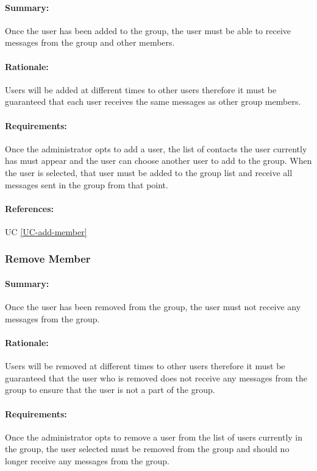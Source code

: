 \documentclass[11pt]{article}
\begin{document}
\paragraph{Summary:}
Once the user has been added to the group, the user must be able to receive messages from the group and other members.
\paragraph{Rationale:}
Users will be added at different times to other users therefore it must be guaranteed that each user receives the same messages as other group members.
\paragraph{Requirements:}
Once the administrator opts to add a user, the list of contacts the user currently has must appear and the user can choose another user to add to the group. When the user is selected, that user must be added to the group list and receive all messages sent in the group from that point.
\paragraph{References:} UC \ref{UC-add-member}

\subsubsection{Remove Member} \label{FR-remove-member}
\paragraph{Summary:}
Once the user has been removed from the group, the user must not receive any messages from the group.
\paragraph{Rationale:}
Users will be removed at different times to other users therefore it must be guaranteed that the user who is removed does not receive any messages from the group to ensure that the user is not a part of the group.
\paragraph{Requirements:}
Once the administrator opts to remove a user from the list of users currently in the group, the user selected must be removed from the group and should no longer receive any messages from the group.
\end{document}
